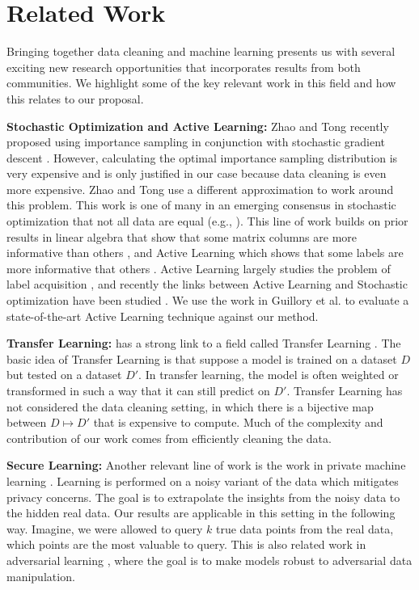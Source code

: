 \section{Related Work}
Bringing together data cleaning and machine learning presents us with several exciting new research opportunities that incorporates results from both communities.
We highlight some of the key relevant work in this field and how this relates to our proposal.

\noindent \textbf{Stochastic Optimization and Active Learning: } Zhao and Tong recently proposed using importance sampling in conjunction with stochastic gradient descent \cite{zhao2014stochastic}. 
However, calculating the optimal importance sampling distribution is very expensive and is only justified in our case because data cleaning is even more expensive. 
Zhao and Tong use a different approximation to work around this problem. 
This work is one of many in an emerging consensus in stochastic optimization that not all data are equal (e.g., \cite{qu2014randomized}). 
This line of work builds on prior results in linear algebra that show that some matrix columns are more informative than others \cite{drineas2012fast}, and Active Learning which shows that some labels are more informative that others \cite{settles2010active}.
Active Learning largely studies the problem of label acquisition \cite{settles2010active},
and recently the links between Active Learning and Stochastic optimization have been studied \cite{guillory2009active}. 
We use the work in Guillory et al. to evaluate a state-of-the-art Active Learning technique against our method.

\noindent \textbf{Transfer Learning: }  
\sys has a strong link to a field called Transfer Learning \cite{pan2010survey}. The basic idea of Transfer Learning is that suppose a model is trained on a dataset $D$ but tested on a dataset $D'$. In transfer learning, the model is often weighted or transformed in such a way that it can still predict on $D'$. Transfer Learning has not considered the data cleaning setting, in which there is a bijective map between $D \mapsto D'$ that is expensive to compute. Much of the complexity and contribution of our work comes from efficiently cleaning the data.

\noindent \textbf{Secure Learning: } Another relevant line of work is the work in private machine learning  \cite{wainwright2012privacy, duchi2013local}. Learning is performed on a noisy variant of the data which mitigates privacy concerns. The goal is to extrapolate the insights from the noisy data to the hidden real data. Our results are applicable in this setting in the following way. Imagine, we were allowed to query $k$ true data points from the real data, which points are the most valuable to query. This is also related work in adversarial learning \cite{nelson2012query}, where the goal is to make models robust to adversarial data manipulation.

